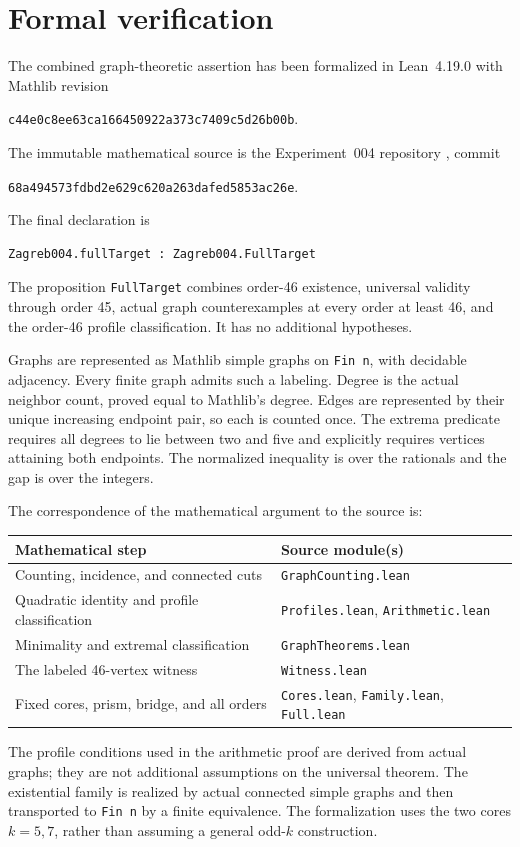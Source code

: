 \documentclass[11pt]{amsart}
\theoremstyle{definition}
\theoremstyle{remark}
\begin{document}
\section{Formal verification}\label{sec:formal}
The combined graph-theoretic assertion has been formalized in Lean~4.19.0 with Mathlib revision
\begin{center}\small\texttt{c44e0c8ee63ca166450922a373c7409c5d26b00b}.\end{center}
The immutable mathematical source is the Experiment~004 repository \cite{Formal}, commit
\begin{center}\small\texttt{68a494573fdbd2e629c620a263dafed5853ac26e}.\end{center}
The final declaration is
\begin{verbatim}
Zagreb004.fullTarget : Zagreb004.FullTarget
\end{verbatim}
The proposition \texttt{FullTarget} combines order-46 existence, universal validity through order 45, actual graph counterexamples at every order at least 46, and the order-46 profile classification. It has no additional hypotheses.

Graphs are represented as Mathlib simple graphs on \texttt{Fin n}, with decidable adjacency. Every finite graph admits such a labeling. Degree is the actual neighbor count, proved equal to Mathlib's degree. Edges are represented by their unique increasing endpoint pair, so each is counted once. The extrema predicate requires all degrees to lie between two and five and explicitly requires vertices attaining both endpoints. The normalized inequality is over the rationals and the gap is over the integers.

The correspondence of the mathematical argument to the source is:
\begin{center}
\small
\begin{tabular}{p{}p{}}
\toprule
Mathematical step & Source module(s)\\
\midrule
Counting, incidence, and connected cuts & \texttt{GraphCounting.lean}\\
Quadratic identity and profile classification & \texttt{Profiles.lean}, \texttt{Arithmetic.lean}\\
Minimality and extremal classification & \texttt{GraphTheorems.lean}\\
The labeled 46-vertex witness & \texttt{Witness.lean}\\
Fixed cores, prism, bridge, and all orders & \texttt{Cores.lean}, \texttt{Family.lean}, \texttt{Full.lean}\\
\bottomrule
\end{tabular}
\end{center}
The profile conditions used in the arithmetic proof are derived from actual graphs; they are not additional assumptions on the universal theorem. The existential family is realized by actual connected simple graphs and then transported to \texttt{Fin n} by a finite equivalence. The formalization uses the two cores $k=5,7$, rather than assuming a general odd-$k$ construction.
\end{document}
